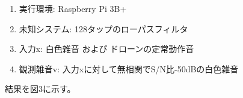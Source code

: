 \documentclass[a4paper, twocolumn]{ltjsarticle}
\begin{document}
    \begin{enumerate}
      \renewcommand{\labelenumi}{(\arabic{enumi})}
      \item 実行環境: Raspberry Pi 3B+
      \item 未知システム: 128タップのローパスフィルタ
      \item 入力x: 白色雑音 および ドローンの定常動作音
      \item 観測雑音v: 入力xに対して無相関でS/N比-50dBの白色雑音
    \end{enumerate}  

    結果を図3に示す。
    

    
    
  



\end{document}
